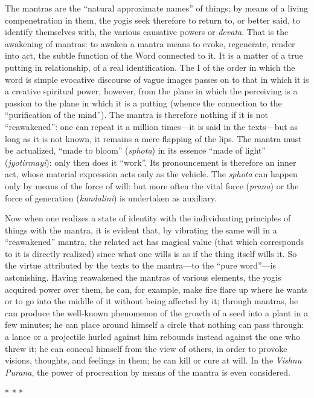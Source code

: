 The mantras are the “natural approximate names” of things; by means of a living compenetration in them, the yogis seek therefore to return to, or better said, to identify themselves with, the various causative powers or \textit{devata}. That is the awakening of mantras: to awaken a mantra means to evoke, regenerate, render into act, the subtle function of the Word connected to it. It is a matter of a true putting in relationship, of a real identification. The I of the order in which the word is simple evocative discourse of vague images passes on to that in which it is a creative spiritual power, however, from the plane in which the perceiving is a passion to the plane in which it is a putting (whence the connection to the “purification of the mind”). The mantra is therefore nothing if it is not “reawakened”: one can repeat it a million times—it is said in the texts—but as long as it is not known, it remains a mere flapping of the lips. The mantra must be actualized, “made to bloom” (\textit{sphota}) in its essence “made of light” (\textit{jyotirmayi}): only then does it “work”. Its pronouncement is therefore an inner act, whose material expression acts only as the vehicle. The \textit{sphota} can happen only by means of the force of will: but more often the vital force (\textit{prana}) or the force of generation (\textit{kundalini}) is undertaken as auxiliary.

Now when one realizes a state of identity with the individuating principles of things with the mantra, it is evident that, by vibrating the same will in a “reawakened” mantra, the related act has magical value (that which corresponds to it is directly realized) since what one wills is as if the thing itself wills it. So the virtue attributed by the texts to the mantra—to the “pure word”—is astonishing. Having reawakened the mantras of various elements, the yogis acquired power over them, he can, for example, make fire flare up where he wants or to go into the middle of it without being affected by it; through mantras, he can produce the well-known phenomenon of the growth of a seed into a plant in a few minutes; he can place around himself a circle that nothing can pass through: a lance or a projectile hurled against him rebounds instead against the one who threw it; he can conceal himself from the view of others, in order to provoke visions, thoughts, and feelings in them; he can kill or cure at will. In the \textit{Vishnu Purana}, the power of procreation by means of the mantra is even considered.




\begin{center}* * *\end{center}

\begin{footnotesize}\begin{sffamily}




\end{sffamily}\end{footnotesize}
